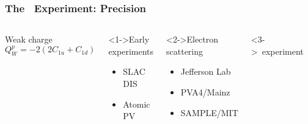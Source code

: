 \begin{frame}
 \frametitle{The \Qweak\ Experiment: Precision}
 \abovedisplayskip=0pt
 \abovedisplayshortskip=0pt
 \begin{columns}[T]
   \begin{block}{Weak charge}
    $Q^p_W = -2 (2C_{1u} + C_{1d})$
   \end{block}
   \begin{block}<1->{Early experiments}
    \begin{itemize}
     \item SLAC DIS
     \item Atomic PV
    \end{itemize}
   \end{block}
   \begin{block}<2->{Electron scattering}
    \begin{itemize}
     \item Jefferson Lab
     \item PVA4/Mainz
     \item SAMPLE/MIT
    \end{itemize}
   \end{block}
   \begin{block}<3->{\Qweak\ experiment}
   \end{block}
   \begin{figure}
    \begin{center}
    \end{center}
   \end{figure}
 \end{columns}
\end{frame}
